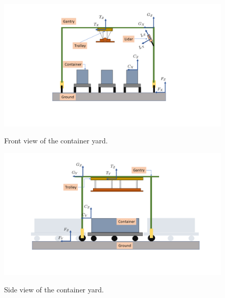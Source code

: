 \begin{figure}
	{\includegraphics[trim={5.0cm 3.0cm 5.0cm 1.0cm},clip, width=\columnwidth]{./img/field_frames1.png}}
	\caption{Front view of the container yard.}
	\label{fig:field_front_view}
\end{figure}

\begin{figure}
	{\includegraphics[trim={7.0cm 3.0cm 7.0cm 1.0cm},clip, width=\columnwidth]{./img/field_frames2.png}}
	\caption{Side view of the container yard.}
	\label{fig:field_side_view}
\end{figure}